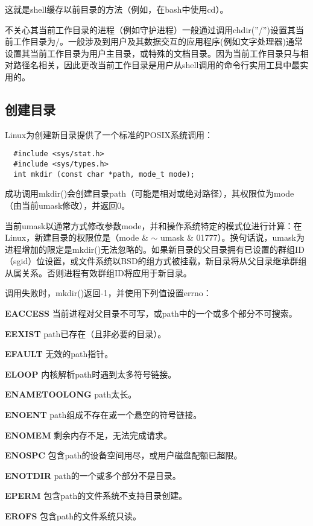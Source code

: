 这就是shell缓存以前目录的方法（例如，在bash中使用cd）。

不关心其当前工作目录的进程（例如守护进程）一般通过调用chdir(''/'')设置其当前工作目录为/。一般涉及到用户及其数据交互的应用程序(例如文字处理器)通常设置其当前工作目录为用户主目录，或特殊的文档目录。因为当前工作目录只与相对路径名相关，因此更改当前工作目录是用户从shell调用的命令行实用工具中最实用的。

\subsection{创建目录}

Linux为创建新目录提供了一个标准的POSIX系统调用：

\begin{lstlisting}
  #include <sys/stat.h>
  #include <sys/types.h>
  int mkdir (const char *path, mode_t mode);
\end{lstlisting}

成功调用mkdir()会创建目录path（可能是相对或绝对路径），其权限位为mode（由当前umask修改），并返回0。

当前umask以通常方式修改参数mode，并和操作系统特定的模式位进行计算：在Linux，新建目录的权限位是（mode \& $\sim$ umask \& 01777）。换句话说，umask为进程增加的限定是mkdir()无法忽略的。如果新目录的父目录拥有已设置的群组ID（sgid）位设置，或文件系统以BSD的组方式被挂载，新目录将从父目录继承群组从属关系。否则进程有效群组ID将应用于新目录。 

调用失败时，mkdir()返回-1，并使用下列值设置errno：

\begin{eqlist*}
\item[\textbf{EACCESS}] 当前进程对父目录不可写，或path中的一个或多个部分不可搜索。
\item[\textbf{EEXIST}] path已存在（且非必要的目录）。
\item[\textbf{EFAULT}] 无效的path指针。
\item[\textbf{ELOOP}] 内核解析path时遇到太多符号链接。
\item[\textbf{ENAMETOOLONG}] path太长。
\item[\textbf{ENOENT}] path组成不存在或一个悬空的符号链接。
\item[\textbf{ENOMEM}] 剩余内存不足，无法完成请求。
\item[\textbf{ENOSPC}] 包含path的设备空间用尽，或用户磁盘配额已超限。
\item[\textbf{ENOTDIR}] path的一个或多个部分不是目录。
\item[\textbf{EPERM}] 包含path的文件系统不支持目录创建。
\item[\textbf{EROFS}] 包含path的文件系统只读。
\end{eqlist*}

